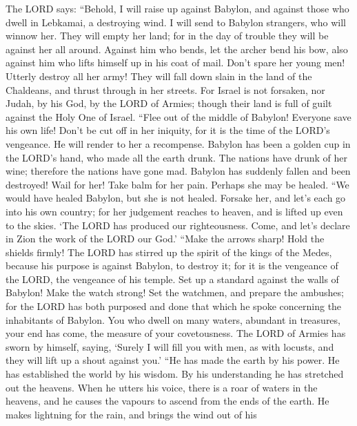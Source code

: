  The LORD says: ``Behold, I will raise up against Babylon,
and against those who dwell in Lebkamai, a destroying wind.
 I will send to Babylon strangers, who will winnow her.
They will empty her land; for in the day of trouble they will be against
her all around.  Against him who bends, let the archer
bend his bow, also against him who lifts himself up in his coat of mail.
Don't spare her young men! Utterly destroy all her army! 
They will fall down slain in the land of the Chaldeans, and thrust
through in her streets.  For Israel is not forsaken, nor
Judah, by his God, by the LORD of Armies; though their land is full of
guilt against the Holy One of Israel.  ``Flee out of the
middle of Babylon! Everyone save his own life! Don't be cut off in her
iniquity, for it is the time of the LORD's vengeance. He will render to
her a recompense.  Babylon has been a golden cup in the
LORD's hand, who made all the earth drunk. The nations have drunk of her
wine; therefore the nations have gone mad.  Babylon has
suddenly fallen and been destroyed! Wail for her! Take balm for her
pain. Perhaps she may be healed.  ``We would have healed
Babylon, but she is not healed. Forsake her, and let's each go into his
own country; for her judgement reaches to heaven, and is lifted up even
to the skies.  `The LORD has produced our righteousness.
Come, and let's declare in Zion the work of the LORD our God.'
 ``Make the arrows sharp! Hold the shields firmly! The
LORD has stirred up the spirit of the kings of the Medes, because his
purpose is against Babylon, to destroy it; for it is the vengeance of
the LORD, the vengeance of his temple.  Set up a standard
against the walls of Babylon! Make the watch strong! Set the watchmen,
and prepare the ambushes; for the LORD has both purposed and done that
which he spoke concerning the inhabitants of Babylon. 
You who dwell on many waters, abundant in treasures, your end has come,
the measure of your covetousness.  The LORD of Armies has
sworn by himself, saying, `Surely I will fill you with men, as with
locusts, and they will lift up a shout against you.' 
``He has made the earth by his power. He has established the world by
his wisdom. By his understanding he has stretched out the heavens.
 When he utters his voice, there is a roar of waters in
the heavens, and he causes the vapours to ascend from the ends of the
earth. He makes lightning for the rain, and brings the wind out of his
